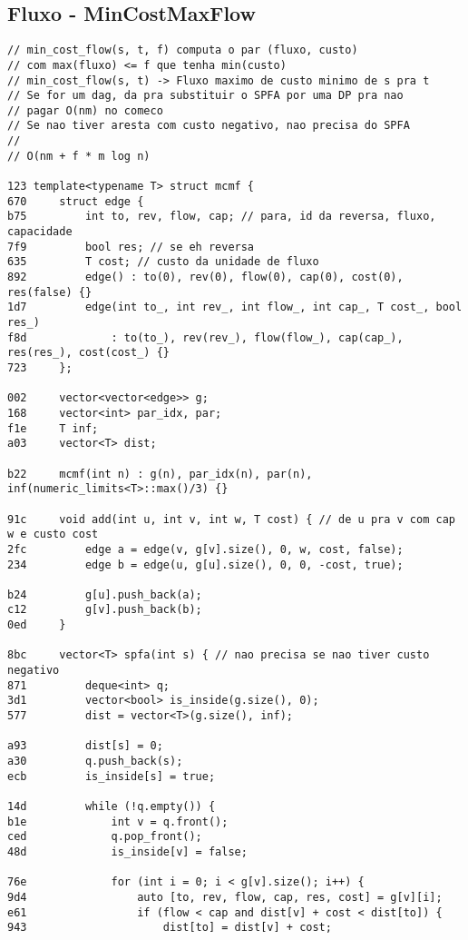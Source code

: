 \documentclass[11pt, a4paper, twoside]{article}
\begin{document}
\subsection{Fluxo - MinCostMaxFlow}
\begin{lstlisting}
// min_cost_flow(s, t, f) computa o par (fluxo, custo)
// com max(fluxo) <= f que tenha min(custo)
// min_cost_flow(s, t) -> Fluxo maximo de custo minimo de s pra t
// Se for um dag, da pra substituir o SPFA por uma DP pra nao
// pagar O(nm) no comeco
// Se nao tiver aresta com custo negativo, nao precisa do SPFA
//
// O(nm + f * m log n)

123 template<typename T> struct mcmf {
670 	struct edge {
b75 		int to, rev, flow, cap; // para, id da reversa, fluxo, capacidade
7f9 		bool res; // se eh reversa
635 		T cost; // custo da unidade de fluxo
892 		edge() : to(0), rev(0), flow(0), cap(0), cost(0), res(false) {}
1d7 		edge(int to_, int rev_, int flow_, int cap_, T cost_, bool res_)
f8d 			: to(to_), rev(rev_), flow(flow_), cap(cap_), res(res_), cost(cost_) {}
723 	};
    
002 	vector<vector<edge>> g;
168 	vector<int> par_idx, par;
f1e 	T inf;
a03 	vector<T> dist;
    
b22 	mcmf(int n) : g(n), par_idx(n), par(n), inf(numeric_limits<T>::max()/3) {}
    
91c 	void add(int u, int v, int w, T cost) { // de u pra v com cap w e custo cost
2fc 		edge a = edge(v, g[v].size(), 0, w, cost, false);
234 		edge b = edge(u, g[u].size(), 0, 0, -cost, true);
    
b24 		g[u].push_back(a);
c12 		g[v].push_back(b);
0ed 	}
    
8bc 	vector<T> spfa(int s) { // nao precisa se nao tiver custo negativo
871 		deque<int> q;
3d1 		vector<bool> is_inside(g.size(), 0);
577 		dist = vector<T>(g.size(), inf);
    
a93 		dist[s] = 0;
a30 		q.push_back(s);
ecb 		is_inside[s] = true;
    
14d 		while (!q.empty()) {
b1e 			int v = q.front();
ced 			q.pop_front();
48d 			is_inside[v] = false;
    
76e 			for (int i = 0; i < g[v].size(); i++) {
9d4 				auto [to, rev, flow, cap, res, cost] = g[v][i];
e61 				if (flow < cap and dist[v] + cost < dist[to]) {
943 					dist[to] = dist[v] + cost;
    

\end{lstlisting}
\end{document}
